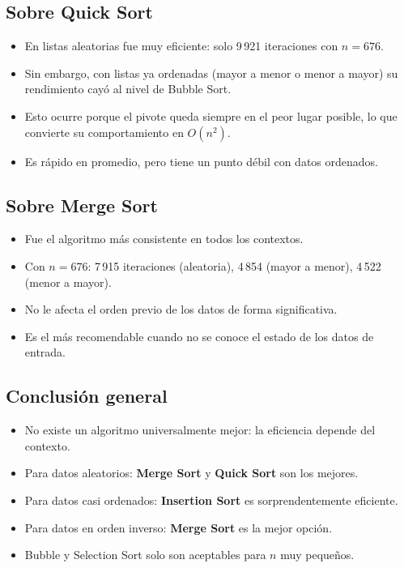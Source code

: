 \documentclass[12pt]{article}
\begin{document}
\subsection*{Sobre Quick Sort}

\begin{itemize}
    \item En listas aleatorias fue muy eficiente: solo 9\,921 iteraciones con $n=676$.
    \item Sin embargo, con listas ya ordenadas (mayor a menor o menor a mayor) su rendimiento cayó al nivel de Bubble Sort.
    \item Esto ocurre porque el pivote queda siempre en el peor lugar posible, lo que convierte su comportamiento en $O(n^2)$.
    \item Es rápido en promedio, pero tiene un punto débil con datos ordenados.
\end{itemize}

\subsection*{Sobre Merge Sort}

\begin{itemize}
    \item Fue el algoritmo más consistente en todos los contextos.
    \item Con $n=676$: 7\,915 iteraciones (aleatoria), 4\,854 (mayor a menor), 4\,522 (menor a mayor).
    \item No le afecta el orden previo de los datos de forma significativa.
    \item Es el más recomendable cuando no se conoce el estado de los datos de entrada.
\end{itemize}



\subsection*{Conclusión general}

\begin{itemize}
    \item No existe un algoritmo universalmente mejor: la eficiencia depende del contexto.
    \item Para datos aleatorios: \textbf{Merge Sort} y \textbf{Quick Sort} son los mejores.
    \item Para datos casi ordenados: \textbf{Insertion Sort} es sorprendentemente eficiente.
    \item Para datos en orden inverso: \textbf{Merge Sort} es la mejor opción.
    \item Bubble y Selection Sort solo son aceptables para $n$ muy pequeños.
\end{itemize}
\end{document}
